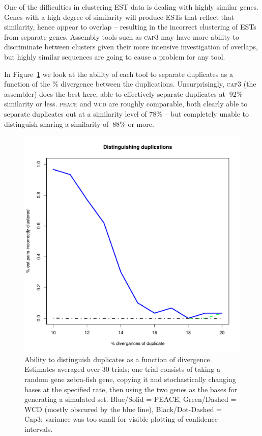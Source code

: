 \documentclass[a4paper,12pt]{article}
\newcommand{\peace} {{\small PEACE}}
\newcommand{\wcd} {{\small WCD}}
\newcommand{\capthree} {{\small Cap3}}
\begin{document}
\begin{appendix}
One of the difficulties in clustering EST data is dealing with
highly similar genes.  Genes with a high degree of similarity will
produce ESTs that reflect that similarity, hence appear to overlap --
resulting in the incorrect clustering of ESTs from separate genes.  Assembly tools
such as \textsc{cap3} may have more ability to discriminate between clusters
given their more intensive investigation of overlaps, but highly
similar sequences are going to cause a problem for any tool. 

In Figure~\ref{dups} we look at the ability of each tool to separate
duplicates as a function of the \% divergence between the
duplications.  Unsurprisingly, \textsc{cap3} (the assembler) does the best
here, able to effectively separate duplicates at $~92\%$ similarity
or less.  \textsc{peace} and \textsc{wcd} are roughly comparable, both clearly able to
separate duplicates out at a similarity level of $78\%$ -- but completely 
unable to distinguish sharing a similarity of $~88\%$ or more. 

\begin{figure}[tbp]
\centerline{
\includegraphics[scale=0.35]{pics.d/duplicates_40.pdf}
}
\caption{Ability to distinguish duplicates as a function of
  divergence.  Estimates averaged over 30 trials; one trial consists
  of taking a random gene zebra-fish gene, copying it and stochastically changing
  bases at the specified rate, then using the two genes as the bases
  for generating a simulated set. Blue/Solid = \peace, Green/Dashed =
  \wcd\/ (mostly obscured by the blue line), Black/Dot-Dashed =
  \capthree; variance was too small for visible plotting of
  confidence intervals.}\label{dups}
\end{figure}


\end{appendix}
\end{document}
